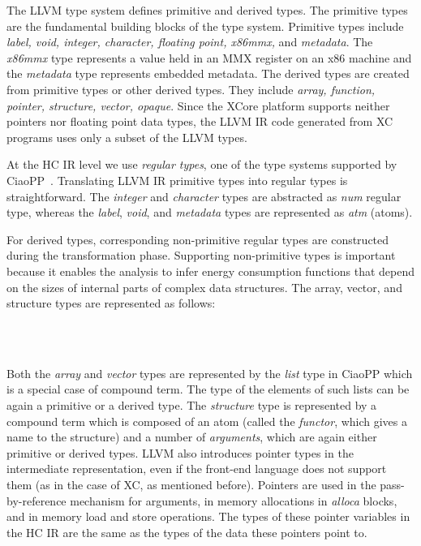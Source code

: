 \documentclass{llncs}
\newcommand{\hcir}{HC IR\xspace}
\newcommand{\llvmir}{LLVM IR\xspace}
\newcommand{\ciaopp}{CiaoPP\xspace}
\begin{document}
The LLVM type system defines primitive and derived types. The
primitive types are the fundamental building blocks of the type
system. Primitive types include \textit{label, void, integer,
  character, floating point, x86mmx,} and \textit{metadata}. The
\textit{x86mmx} type represents a value held in an MMX register on an
x86 machine and the \textit{metadata} type represents embedded
metadata. The derived types are created from primitive types or other
derived types. They include \textit{array, function, pointer,
  structure, vector, opaque}. Since the XCore platform 
supports neither pointers nor floating point data types, the \llvmir code
generated from XC programs uses only a subset of the LLVM types.

At the \hcir level we use \emph{regular types}, one of the type
systems supported by \ciaopp~\cite{ciaopp-sas03-journal-scp}.  Translating \llvmir primitive types
into regular types is straightforward. The \textit{integer} and
\textit{character} types are 
abstracted as \textit{num} regular type, whereas the
\textit{label}, \textit{void}, and \textit{metadata} types are
represented as \textit{atm} (atoms). 

For derived types, corresponding non-primitive regular types are
constructed during the transformation phase. Supporting non-primitive
types is important because it enables the analysis to infer energy
consumption functions that depend on the sizes of internal parts of
complex data structures. 
The array, vector, and structure types are represented as
follows:
\begin{center}
\\
\\
 
\end{center}
Both the \textit{array} and \textit{vector} types are represented by
the \textit{list} type in \ciaopp which is a special case of compound
term. The type of the elements of such lists can be again a primitive
or a derived type. The \textit{structure} type is represented by a
compound term which is composed of an atom (called the
\textit{functor}, which gives a name to the structure) and a number of
\textit{arguments}, which are again either primitive or derived
types. LLVM also introduces pointer types in the intermediate
representation, even if the front-end language does not support them
(as in the case of XC, as mentioned before). Pointers are used in the
pass-by-reference mechanism for arguments, in memory allocations in
\textit{alloca} blocks, and in memory load and store operations. The
types of these pointer variables in the \hcir are the same as the
types of the data these pointers point to.
\end{document}
